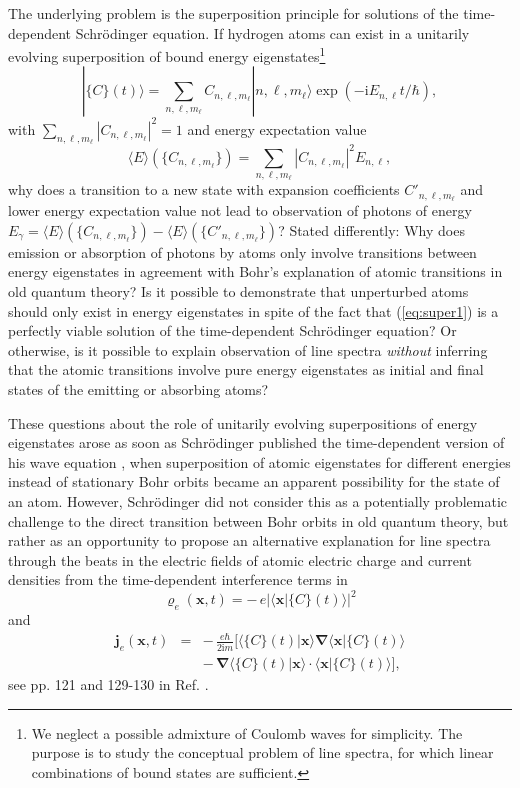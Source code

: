 \documentclass[final,3p,12pt]{elsarticle3}
\begin{document}
The underlying problem is the superposition principle for solutions of the 
time-dependent Schr\"odinger equation. If hydrogen atoms can exist in a 
unitarily evolving superposition of bound energy 
eigenstates\footnote{We neglect a possible admixture of Coulomb waves for
simplicity. The purpose is to study the conceptual problem of line
spectra, for which linear combinations of bound states are sufficient.}
\begin{equation}\label{eq:super1}
|\{C\}(t)\rangle=\sum_{n,\ell,m_\ell}C_{n,\ell,m_\ell}|n,\ell,m_\ell\rangle
\exp(-\mathrm{i}E_{n,\ell}t/\hbar),
\end{equation}
with $\sum_{n,\ell,m_\ell}|C_{n,\ell,m_\ell}|^2=1$ and energy expectation value
\[
\langle E\rangle(\{C_{n,\ell,m_\ell}\})
=\sum_{n,\ell,m_\ell}|C_{n,\ell,m_\ell}|^2E_{n,\ell},
\]
why does a transition to a new state with expansion coefficients $C'_{n,\ell,m_\ell}$
and lower energy expectation value not lead to observation of photons of energy
$E_\gamma=\langle E\rangle(\{C_{n,\ell,m_\ell}\})-\langle E\rangle(\{C'_{n,\ell,m_\ell}\})$?
Stated differently: Why does emission or absorption of photons by atoms only 
involve transitions between energy eigenstates in agreement with Bohr's explanation
of atomic transitions in old quantum theory? 
Is it possible to demonstrate that unperturbed atoms should only exist in energy
eigenstates in spite of the fact that (\ref{eq:super1}) is a perfectly viable
solution of the time-dependent Schr\"odinger equation?
Or otherwise, is it possible to explain 
observation of line spectra \textit{without} inferring that the atomic transitions 
involve pure energy eigenstates as initial and final states of the emitting or 
absorbing atoms?

These questions about the role of unitarily evolving superpositions of energy
eigenstates arose as soon as Schr\"odinger published the time-dependent version of 
his wave equation \cite{erwin}, when superposition of atomic eigenstates for 
different energies instead of stationary Bohr orbits became an apparent possibility for 
the state of an atom. However, Schr\"odinger did not consider this as a potentially 
problematic challenge to the direct transition between Bohr orbits in old quantum 
theory, but rather as an opportunity to propose an alternative explanation for line 
spectra through the beats in the electric fields of atomic electric charge and current 
densities from the time-dependent interference terms in
\[
\varrho_e(\bm{x},t)=-\,e|\langle\bm{x}|\{C\}(t)\rangle|^2
\]
and
\begin{eqnarray}\nonumber
\bm{j}_e(\bm{x},t)&=&-\,\frac{e\hbar}{2\mathrm{i}m}[
\langle\{C\}(t)|\bm{x}\rangle\bm{\nabla}\langle\bm{x}|\{C\}(t)\rangle
\\ \label{eq:je}
&&-\,\bm{\nabla}\langle\{C\}(t)|\bm{x}\rangle\cdot\langle\bm{x}|\{C\}(t)\rangle],
\end{eqnarray}
see pp. 121 and 129-130 in Ref. \cite{erwin}. 
\end{document}
